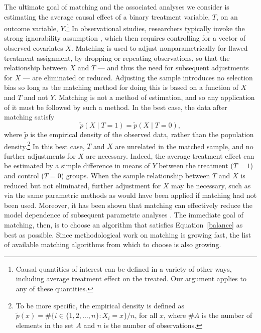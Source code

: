 \documentclass[11pt,titlepage]{article}
\begin{document}
The ultimate goal of matching and the associated analyses we consider
is estimating the average causal effect of a binary treatment
variable, $T$, on an outcome variable, $Y$.\footnote{Causal quantities
  of interest can be defined in a variety of other ways, including
  average treatment effect on the treated.  Our argument applies to
  any of these quantities.}  In observational studies, researchers
typically invoke the strong ignorability assumption \citep{RosRub83},
which then requires controlling for a vector of observed covariates
$X$.  Matching is used to adjust nonparametrically for flawed
treatment assignment, by dropping or repeating observations, so that
the relationship between $X$ and $T$ --- and thus the need for
subsequent adjustments for $X$ --- are eliminated or reduced.
Adjusting the sample introduces no selection bias so long as the
matching method for doing this is based on a function of $X$ and $T$
and not $Y$.  Matching is not a method of estimation, and so any
application of it must be followed by such a method.  In the best
case, the data after matching satisfy
\begin{equation}
  \label{balance}
  \tilde p(X\mid T=1) = \tilde p(X\mid T=0),
\end{equation}
where $\tilde p$ is the empirical density of the observed data, rather
than the population density.\footnote{To be more specific, the
  empirical density is defined as $\tilde p(x) = \# \{ i\in \{1, 2,
  \dots, n \}: X_i = x \} / n$, for all $x$, where $\#A$ is the number
  of elements in the set $A$ and $n$ is the number of observations. }
In this best case, $T$ and $X$ are unrelated in the matched sample,
and no further adjustments for $X$ are necessary. Indeed, the average
treatment effect can be estimated by a simple difference in means of
$Y$ between the treatment ($T=1$) and control ($T=0$) groups.  When the
sample relationship between $T$ and $X$ is reduced but not eliminated,
further adjustment for $X$ may be necessary, such as via the same
parametric methods as would have been applied if matching had not been
used. Moreover, it has been shown that matching can effectively reduce
the model dependence of subsequent parametric analyses
\citep{HoImaKin06}.  The immediate goal of matching, then, is to
choose an algorithm that satisfies Equation~\ref{balance} as best as
possible.  Since methodological work on matching is growing fast, the
list of available matching algorithms from which to choose is also
growing.
\end{document}
